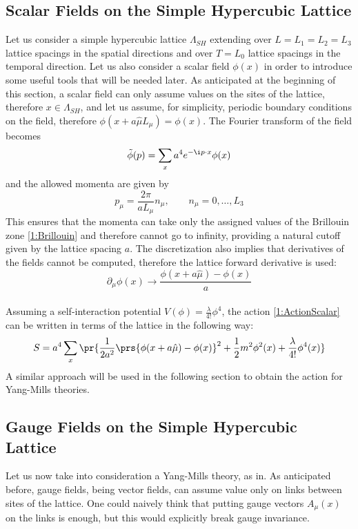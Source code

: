 \subsection{Scalar Fields on the Simple Hypercubic Lattice}
Let us consider a simple hypercubic lattice $\Lambda_{SH}$ extending over $L=L_1=L_2=L_3$ lattice spacings in the spatial directions and over $T=L_0$ lattice spacings in the temporal direction.
Let us also consider a scalar field $\phi(x)$ in order to introduce some useful tools that will be needed later.
As anticipated at the beginning of this section, a scalar field can only assume values on the sites of the lattice, therefore $x\in\Lambda_{SH}$, and let us assume, for simplicity, periodic boundary conditions on the field, therefore $\phi(x+a\hat\mu L_\mu)=\phi(x)$.
The Fourier transform of the field becomes
\begin{equation}
    \tilde\phi(p)=\sum_x a^4 e^{-\i p\cdot x}\phi(x) \label{1:FourierScalar}
\end{equation}
and the allowed momenta are given by
\begin{equation}
    p_\mu=\frac{2\pi}{aL_\mu}n_\mu, \qquad n_\mu=0, \dots, L_3 \label{1:Brillouin}
\end{equation}
This ensures that the momenta can take only the assigned values of the Brillouin zone \eqref{1:Brillouin} and therefore cannot go to infinity, providing a natural cutoff given by the lattice spacing $a$.
The discretization also implies that derivatives of the fields cannot be computed, therefore the lattice forward derivative is used:
\begin{equation}
    \partial_\mu\phi(x)\rightarrow\frac{\phi(x+a\hat\mu)-\phi(x)}{a} \label{1:ForwardLatticeDerivative}
\end{equation}\\
Assuming a self-interaction potential $V(\phi)=\frac\lambda{4!}\phi^4$, the action \eqref{1:ActionScalar} can be written in terms of the lattice in the following way:
\begin{equation}
    S=a^4\sum_x\pr{\frac1{2a^2}\prs{\phi(x+a\hat\mu)-\phi(x)}^2+\frac12m^2\phi^2(x)+\frac\lambda{4!}\phi^4(x)} \label{1:ScalarActionLattice}
\end{equation}
A similar approach will be used in the following section to obtain the action for Yang-Mills theories.

\subsection{Gauge Fields on the Simple Hypercubic Lattice}
Let us now take into consideration a Yang-Mills theory, as in.
As anticipated before, gauge fields, being vector fields, can assume value only on links between sites of the lattice.
One could naively think that putting gauge vectors $A_\mu(x)$ on the links is enough, but this would explicitly break gauge invariance.
